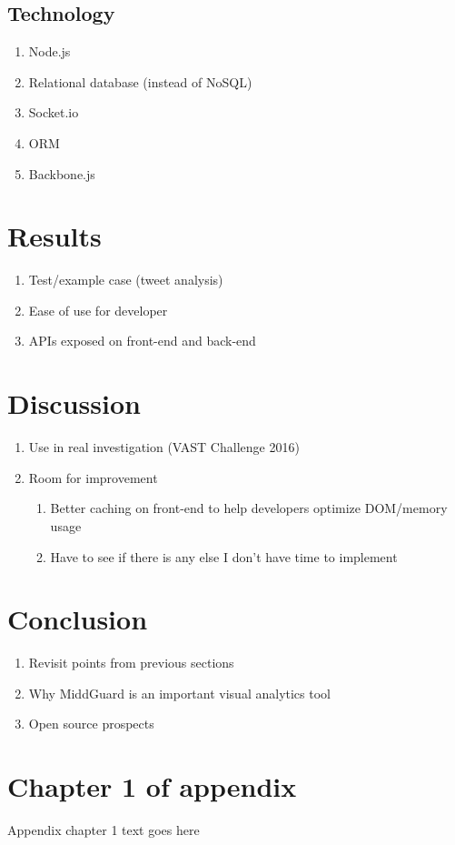 \documentclass[midd]{thesis}
\begin{document}
\section{Technology}
  \begin{enumerate}
    \item Node.js
    \item Relational database (instead of NoSQL)
    \item Socket.io
    \item ORM
    \item Backbone.js
  \end{enumerate}

\chapter{Results}
  \begin{enumerate}
    \item Test/example case (tweet analysis)
    \item Ease of use for developer
    \item APIs exposed on front-end and back-end
  \end{enumerate}

\chapter{Discussion}
  \begin{enumerate}
    \item Use in real investigation (VAST Challenge 2016)
    \item Room for improvement
    \begin{enumerate}
      \item Better caching on front-end to help developers optimize DOM/memory
      usage
      \item Have to see if there is any else I don't have time to implement
    \end{enumerate}
  \end{enumerate}

\chapter{Conclusion}
  \begin{enumerate}
    \item Revisit points from previous sections
    \item Why MiddGuard is an important visual analytics tool
    \item Open source prospects
  \end{enumerate}

\appendix
\chapter{Chapter 1 of appendix}
Appendix chapter 1 text goes here


\end{document}
